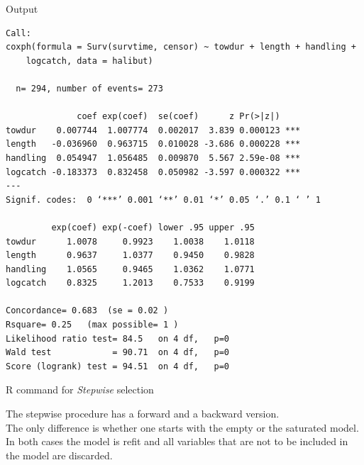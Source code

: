 \documentclass[envcountsect, 10pt, portrait, palatino]{beamer}
\begin{document}
\begin{frame}[fragile]{Output}

\scriptsize
\begin{verbatim}
Call:
coxph(formula = Surv(survtime, censor) ~ towdur + length + handling +
    logcatch, data = halibut)

  n= 294, number of events= 273

              coef exp(coef)  se(coef)      z Pr(>|z|)
towdur    0.007744  1.007774  0.002017  3.839 0.000123 ***
length   -0.036960  0.963715  0.010028 -3.686 0.000228 ***
handling  0.054947  1.056485  0.009870  5.567 2.59e-08 ***
logcatch -0.183373  0.832458  0.050982 -3.597 0.000322 ***
---
Signif. codes:  0 ‘***’ 0.001 ‘**’ 0.01 ‘*’ 0.05 ‘.’ 0.1 ‘ ’ 1

         exp(coef) exp(-coef) lower .95 upper .95
towdur      1.0078     0.9923    1.0038    1.0118
length      0.9637     1.0377    0.9450    0.9828
handling    1.0565     0.9465    1.0362    1.0771
logcatch    0.8325     1.2013    0.7533    0.9199

Concordance= 0.683  (se = 0.02 )
Rsquare= 0.25   (max possible= 1 )
Likelihood ratio test= 84.5   on 4 df,   p=0
Wald test            = 90.71  on 4 df,   p=0
Score (logrank) test = 94.51  on 4 df,   p=0
\end{verbatim}
\end{frame}
\begin{frame}[fragile]{R command for \textit{Stepwise} selection}

The stepwise procedure has a forward and a backward version. \\[2ex]
The only difference is whether one starts with the empty or the saturated model. In both cases the model is refit and all variables that are not to be included in the model are discarded.
\end{frame}
\end{document}
